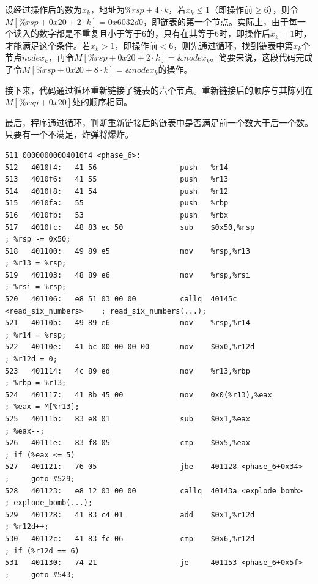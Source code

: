 \documentclass{article}
\begin{document}
设经过操作后的数为$x_k$，地址为$\%rsp + 4\cdot k$，若$x_k \le 1$（即操作前$\ge 6$），则令$M[\%rsp + 0x20 + 2 \cdot k] = 0x6032d0$，即链表的第一个节点。实际上，由于每一个读入的数字都是不重复且小于等于6的，只有在其等于6时，即操作后$x_k=1$时，才能满足这个条件。若$x_k>1$，即操作前$<6$，则先通过循环，找到链表中第$x_k$个节点$nodex_k$，再令$M[\%rsp + 0x20 + 2 \cdot k] = \&nodex_k$。简要来说，这段代码完成了令$M[\%rsp + 0x20 + 8\cdot k] = \&nodex_k$的操作。

接下来，代码通过循环重新链接了链表的六个节点。重新链接后的顺序与其陈列在$M[\%rsp + 0x20]$处的顺序相同。

最后，程序通过循环，判断重新链接后的链表中是否满足前一个数大于后一个数。只要有一个不满足，炸弹将爆炸。

\begin{lstlisting}[title = phase\_6对应的反汇编代码及注释, xleftmargin = 2em,xrightmargin = 2em, aboveskip = 1em, numbers = none, basicstyle=\footnotesize\ttfamily]
511 00000000004010f4 <phase_6>:
512   4010f4:   41 56                   push   %r14
513   4010f6:   41 55                   push   %r13
514   4010f8:   41 54                   push   %r12
515   4010fa:   55                      push   %rbp
516   4010fb:   53                      push   %rbx
517   4010fc:   48 83 ec 50             sub    $0x50,%rsp                   ; %rsp -= 0x50;
518   401100:   49 89 e5                mov    %rsp,%r13                    ; %r13 = %rsp;
519   401103:   48 89 e6                mov    %rsp,%rsi                    ; %rsi = %rsp;
520   401106:   e8 51 03 00 00          callq  40145c <read_six_numbers>    ; read_six_numbers(...);
521   40110b:   49 89 e6                mov    %rsp,%r14                    ; %r14 = %rsp;
522   40110e:   41 bc 00 00 00 00       mov    $0x0,%r12d                   ; %r12d = 0;
523   401114:   4c 89 ed                mov    %r13,%rbp                    ; %rbp = %r13;
524   401117:   41 8b 45 00             mov    0x0(%r13),%eax               ; %eax = M[%r13];
525   40111b:   83 e8 01                sub    $0x1,%eax                    ; %eax--;
526   40111e:   83 f8 05                cmp    $0x5,%eax                    ; if (%eax <= 5)
527   401121:   76 05                   jbe    401128 <phase_6+0x34>        ;     goto #529;
528   401123:   e8 12 03 00 00          callq  40143a <explode_bomb>        ; explode_bomb(...);
529   401128:   41 83 c4 01             add    $0x1,%r12d                   ; %r12d++;
530   40112c:   41 83 fc 06             cmp    $0x6,%r12d                   ; if (%r12d == 6)
531   401130:   74 21                   je     401153 <phase_6+0x5f>        ;     goto #543;

\end{lstlisting}
\end{document}
